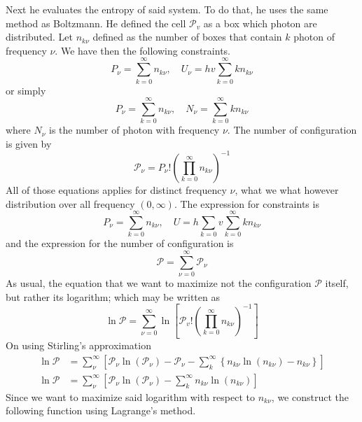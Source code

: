 \documentclass[../../../Main.tex]{subfiles}
\begin{document}
Next he evaluates the entropy of said system. To do that, he uses the same method as Boltzmann. He defined the cell $\mathcal{P}_v$ as a box which photon are distributed. Let $n_{k\nu}$ defined as the number of boxes that contain $k$ photon of frequency $\nu$. We have then the following constraints.
\begin{equation*}
    P_\nu=\sum_{k=0}^{\infty}n_{k\nu},\quad U_\nu= hv\sum_{k=0}^{\infty}kn_{k\nu}
\end{equation*}
or simply
\begin{equation*}
    P_\nu=\sum_{k=0}^{\infty}n_{k\nu},\quad N_\nu= \sum_{k=0}^{\infty} kn_{k\nu}
\end{equation*}
where $N_\nu$ is the number of photon with frequency $\nu$. The number of configuration is given by 
\begin{equation*}
    \mathcal{P}_\nu=P_\nu!\left(\prod_{k=0}^{\infty}n_{k\nu}\right)^{-1}
\end{equation*}  
All of those equations applies for distinct frequency $\nu$, what we what however distribution over all frequency $(0,\infty)$. The expression for constraints is
\begin{equation*}
    P_\nu=\sum_{k=0}^{\infty}n_{k\nu},\quad U= h\sum_{k=0}v\sum_{k=0}^{\infty}kn_{k\nu}
\end{equation*}
and the expression for the number of configuration is 
\begin{equation*}
    \mathcal{P}=\sum_{\nu=0}^{\infty}\mathcal{P}_\nu
\end{equation*} 
As usual, the equation that we want to maximize not the configuration $\mathcal{P}$ itself, but rather its logarithm; which may be written as 
\begin{equation*}
    \ln \mathcal{P}=\sum_{\nu=0}^{\infty}\ln\left[\mathcal{P}_v!\left( \prod_{k=0}^{\infty} n_{k\nu}\right)^{-1}\right]
\end{equation*}
On using Stirling's approximation
\begin{align*}
    \ln \mathcal{P}&=\sum_\nu^\infty\left[\mathcal{P}_\nu\ln \left(\mathcal{P}_\nu\right)-\mathcal{P}_\nu - \sum_{k}^{\infty}\left\{n_{k\nu}\ln \left(n_{k\nu} \right)-n_{k\nu} \right\}\right]\\
    \ln \mathcal{P}&=\sum_\nu^\infty\left[\mathcal{P}_\nu\ln \left(\mathcal{P}_\nu\right) - \sum_{k}^{\infty}n_{k\nu}\ln \left(n_{k\nu} \right)\right]
\end{align*}
Since we want to maximize said logarithm with respect to $n_{k\nu}$, we construct the following function using Lagrange's method.
\end{document}
